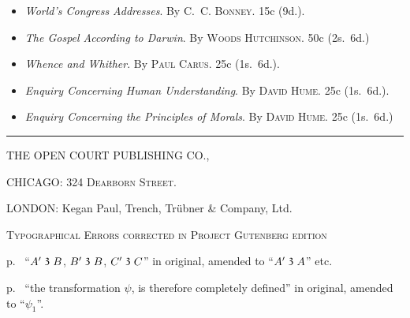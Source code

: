 \documentclass[oneside]{book}
\newcommand\partof{\mathrel{\raisebox{0.45ex}{$\mathfrak{3}$}}}   %
\begin{document}
\begin{small}
\begin{itemize}
\item[]\hspace{-3ex}
\textit{World's Congress Addresses}. By \textsc{C.~C. Bonney}. 15c (9d.).

\item[]\hspace{-3ex} \textit{The Gospel According to Darwin}. By \textsc{Woods Hutchinson}. 50c (2s.~6d.)

\item[]\hspace{-3ex}
\textit{Whence and Whither}. By \textsc{Paul Carus}. 25c (1s.~6d.).

\item[]\hspace{-3ex}
\textit{Enquiry Concerning Human Understanding}. By \textsc{David Hume.} 25c
(1s.~6d.).

\item[]\hspace{-3ex}
\textit{Enquiry Concerning the Principles of Morals}. By \textsc{David Hume}.
25c (1s.~6d.)
\end{itemize}
\end{small}

\begin{center}
\smallskip
\rule[.5ex]{2cm}{.2pt}

\medskip
{\large THE OPEN COURT PUBLISHING CO.,}

\textsc{\small CHICAGO: 324 Dearborn Street.}

{\small LONDON: Kegan Paul, Trench, Trübner \& Company, Ltd.}
\end{center}


\newpage

\begin{center}\textsc{Typographical Errors corrected in Project Gutenberg edition}\end{center}

p.~\pageref{chain} ``$A' \partof B$, $B' \partof B$, $C' \partof C$'' in original,
amended to ``$A' \partof A$'' etc\@.

p.~\pageref{psi1} ``the transformation $\psi$, is therefore completely defined'' in original,
amended to ``$\psi_1$''.
\end{document}
